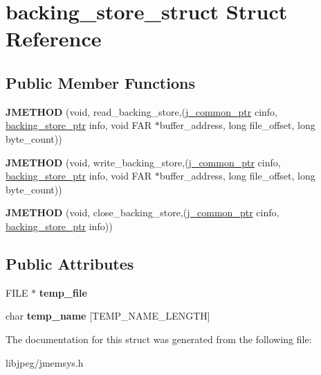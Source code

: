 \hypertarget{structbacking__store__struct}{\section{backing\-\_\-store\-\_\-struct Struct Reference}
\label{structbacking__store__struct}
}
\subsection*{Public Member Functions}
\begin{DoxyCompactItemize}
\item 
\hypertarget{structbacking__store__struct_a22c5a1f420b61a5c3f48e857d61ceb35}{{\bfseries J\-M\-E\-T\-H\-O\-D} (void, read\-\_\-backing\-\_\-store,(\hyperlink{structjpeg__common__struct}{j\-\_\-common\-\_\-ptr} cinfo, \hyperlink{structbacking__store__struct}{backing\-\_\-store\-\_\-ptr} info, void F\-A\-R $\ast$buffer\-\_\-address, long file\-\_\-offset, long byte\-\_\-count))}\label{structbacking__store__struct_a22c5a1f420b61a5c3f48e857d61ceb35}

\item 
\hypertarget{structbacking__store__struct_aa54343491f740a9d799eeb9c3e7e09d2}{{\bfseries J\-M\-E\-T\-H\-O\-D} (void, write\-\_\-backing\-\_\-store,(\hyperlink{structjpeg__common__struct}{j\-\_\-common\-\_\-ptr} cinfo, \hyperlink{structbacking__store__struct}{backing\-\_\-store\-\_\-ptr} info, void F\-A\-R $\ast$buffer\-\_\-address, long file\-\_\-offset, long byte\-\_\-count))}\label{structbacking__store__struct_aa54343491f740a9d799eeb9c3e7e09d2}

\item 
\hypertarget{structbacking__store__struct_a509740a807e120959a02d25ac245eea4}{{\bfseries J\-M\-E\-T\-H\-O\-D} (void, close\-\_\-backing\-\_\-store,(\hyperlink{structjpeg__common__struct}{j\-\_\-common\-\_\-ptr} cinfo, \hyperlink{structbacking__store__struct}{backing\-\_\-store\-\_\-ptr} info))}\label{structbacking__store__struct_a509740a807e120959a02d25ac245eea4}

\end{DoxyCompactItemize}
\subsection*{Public Attributes}
\begin{DoxyCompactItemize}
\item 
\hypertarget{structbacking__store__struct_a90903f2f62f4fe65ac65599b50d0411e}{F\-I\-L\-E $\ast$ {\bfseries temp\-\_\-file}}\label{structbacking__store__struct_a90903f2f62f4fe65ac65599b50d0411e}

\item 
\hypertarget{structbacking__store__struct_aee24b7268410bcf129e83a8e2a2f4d45}{char {\bfseries temp\-\_\-name} \mbox{[}T\-E\-M\-P\-\_\-\-N\-A\-M\-E\-\_\-\-L\-E\-N\-G\-T\-H\mbox{]}}\label{structbacking__store__struct_aee24b7268410bcf129e83a8e2a2f4d45}

\end{DoxyCompactItemize}


The documentation for this struct was generated from the following file\-:\begin{DoxyCompactItemize}
\item 
libjpeg/jmemsys.\-h\end{DoxyCompactItemize}
